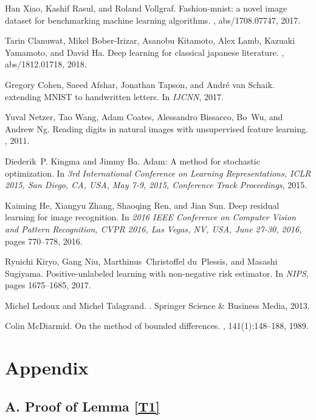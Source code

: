 \documentclass[]{article} \usepackage{geometry}
\begin{document}
\begin{thebibliography}{10}
Han Xiao, Kashif Rasul, and Roland Vollgraf.
\newblock Fashion-mnist: a novel image dataset for benchmarking machine
  learning algorithms.
, abs/1708.07747, 2017.

Tarin Clanuwat, Mikel Bober{-}Irizar, Asanobu Kitamoto, Alex Lamb, Kazuaki
  Yamamoto, and David Ha.
\newblock Deep learning for classical japanese literature.
, abs/1812.01718, 2018.

Gregory Cohen, Saeed Afshar, Jonathan Tapson, and Andr{\'{e}} van Schaik.
 extending {MNIST} to handwritten letters.
\newblock In {\em {IJCNN}}, 2017.

Yuval Netzer, Tao Wang, Adam Coates, Alessandro Bissacco, Bo~Wu, and Andrew Ng.
\newblock Reading digits in natural images with unsupervised feature learning.
, 2011.

Diederik~P. Kingma and Jimmy Ba.
\newblock Adam: {A} method for stochastic optimization.
\newblock In {\em 3rd International Conference on Learning Representations,
  {ICLR} 2015, San Diego, CA, USA, May 7-9, 2015, Conference Track
  Proceedings}, 2015.

Kaiming He, Xiangyu Zhang, Shaoqing Ren, and Jian Sun.
\newblock Deep residual learning for image recognition.
\newblock In {\em 2016 {IEEE} Conference on Computer Vision and Pattern
  Recognition, {CVPR} 2016, Las Vegas, NV, USA, June 27-30, 2016}, pages
  770--778, 2016.

Ryuichi Kiryo, Gang Niu, Marthinus~Christoffel du~Plessis, and Masashi
  Sugiyama.
\newblock Positive-unlabeled learning with non-negative risk estimator.
\newblock In {\em {NIPS}}, pages 1675--1685, 2017.

Michel Ledoux and Michel Talagrand.
.
\newblock Springer Science \& Business Media, 2013.

Colin McDiarmid.
\newblock On the method of bounded differences.
, 141(1):148--188, 1989.

\end{thebibliography}


\newpage
\section*{Appendix}
\subsection*{A. Proof of Lemma \ref{T1}}
\label{AA}
\end{document}

